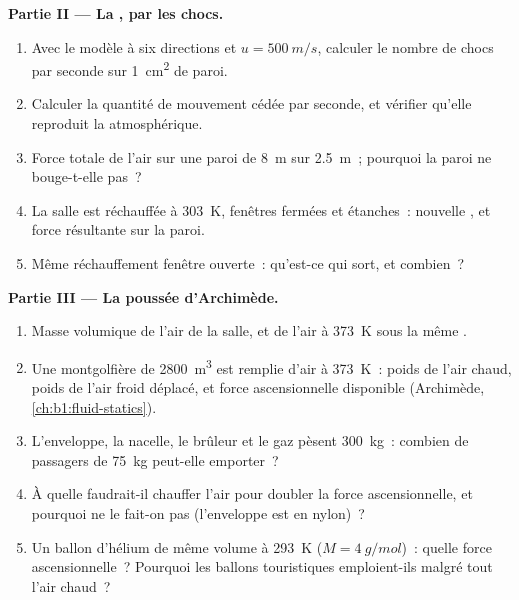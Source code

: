 \begin{problem}
\medskip
\noindent\textbf{Partie II --- La , par les chocs.}
\begin{enumerate}[resume]
  \item Avec le modèle à six directions et $u = \qty{500}{m/s}$, calculer
        le nombre de chocs par seconde sur \qty{1}{cm^2} de paroi.
  \item Calculer la quantité de mouvement cédée par seconde, et vérifier
        qu'elle reproduit la  atmosphérique.
  \item Force totale de l'air sur une paroi de \qty{8}{m} sur \qty{2.5}{m}~;
        pourquoi la paroi ne bouge-t-elle pas~?
  \item La salle est réchauffée à \qty{303}{K}, fenêtres fermées et
        étanches~: nouvelle , et force résultante sur la paroi.
  \item Même réchauffement fenêtre ouverte~: qu'est-ce qui sort, et
        combien~?
\end{enumerate}

\medskip
\noindent\textbf{Partie III --- La poussée d'Archimède.}
\begin{enumerate}[resume]
  \item Masse volumique de l'air de la salle, et de l'air à \qty{373}{K}
        sous la même .
  \item Une montgolfière de \qty{2800}{m^3} est remplie d'air à
        \qty{373}{K}~: poids de l'air chaud, poids de l'air froid
        déplacé, et force ascensionnelle disponible (Archimède,
        \cref{ch:b1:fluid-statics}).
  \item L'enveloppe, la nacelle, le brûleur et le gaz pèsent
        \qty{300}{kg}~: combien de passagers de \qty{75}{kg} peut-elle
        emporter~?
  \item À quelle  faudrait-il chauffer l'air pour doubler la
        force ascensionnelle, et pourquoi ne le fait-on pas (l'enveloppe
        est en nylon)~?
  \item Un ballon d'hélium de même volume à \qty{293}{K}
        ($M = \qty{4}{g/mol}$)~: quelle force ascensionnelle~? Pourquoi
        les ballons touristiques emploient-ils malgré tout l'air chaud~?
\end{enumerate}


\end{problem}
